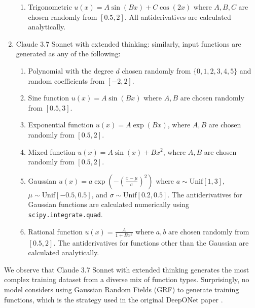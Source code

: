 \documentclass{article}
\begin{document}
\begin{enumerate}
\begin{enumerate}
        \item Trigonometric $u(x) = A \sin(B x) + C \cos(2x)$ where $A, B, C$ are chosen randomly from $[0.5, 2]$.  All antiderivatives are calculated analytically. 
    \end{enumerate}
    \item Claude 3.7 Sonnet with extended thinking: similarly, input functions are generated as any of the following:
    \begin{enumerate}
        \item Polynomial with the degree $d$ chosen randomly from $\{0, 1, 2,3,4,5\}$ and random coefficients from $[-2,2]$. 
        \item Sine function $u(x) = A \sin(B x)$ where $A, B$ are chosen randomly from $[0.5, 3]$. 
        \item Exponential function $u(x) = A \exp(Bx)$, where $A, B$ are chosen randomly from $[0.5,2]$. 
        \item Mixed function $u(x) =  A \sin( x) + B x^2$, where $A, B$ are chosen randomly from $[0.5,2]$. 
        \item Gaussian $u(x) = a \exp\left(-\left(\frac{x - \mu}{\sigma}\right)^2\right)$ where $a \sim \text{Unif}[1, 3]$, $\mu \sim \text{Unif}[-0.5, 0.5]$, and $\sigma \sim \text{Unif}[0.2, 0.5]$. The antiderivatives for Gaussian functions are calculated numerically using \texttt{scipy.integrate.quad}. 
        \item Rational function $u(x) = \frac{A}{1 + B x^2}$ where $a, b$ are chosen randomly from $[0.5,2]$. The antiderivatives for functions other than the Gaussian are calculated analytically.  
    \end{enumerate}
\end{enumerate}


We observe that Claude 3.7 Sonnet with extended thinking generates the most complex training dataset from a diverse mix of function types. Surprisingly, no model considers using Gaussian Random Fields (GRF) to generate training functions, which is the strategy used in the original DeepONet paper \cite{deeponet}. 
\end{document}
